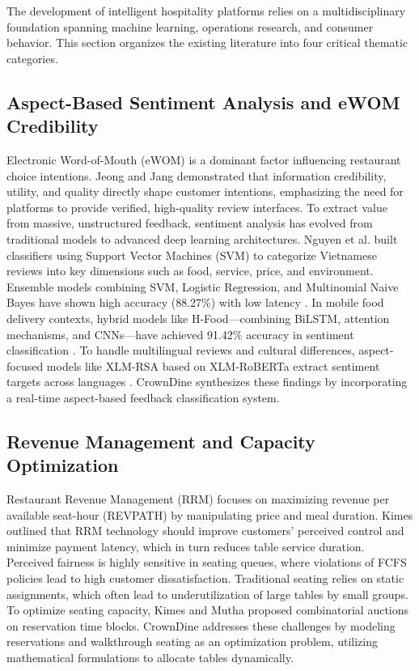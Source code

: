 \documentclass[pdflatex,sn-mathphys-num]{sn-jnl}%
\theoremstyle{thmstyleone}%
\theoremstyle{thmstyletwo}%
\theoremstyle{thmstylethree}%
\begin{document}
The development of intelligent hospitality platforms relies on a multidisciplinary foundation spanning machine learning, operations research, and consumer behavior. This section organizes the existing literature into four critical thematic categories.

\subsection{Aspect-Based Sentiment Analysis and eWOM Credibility}
Electronic Word-of-Mouth (eWOM) is a dominant factor influencing restaurant choice intentions. Jeong and Jang \cite{art6} demonstrated that information credibility, utility, and quality directly shape customer intentions, emphasizing the need for platforms to provide verified, high-quality review interfaces. To extract value from massive, unstructured feedback, sentiment analysis has evolved from traditional models to advanced deep learning architectures. Nguyen et al. \cite{art3} built classifiers using Support Vector Machines (SVM) to categorize Vietnamese reviews into key dimensions such as food, service, price, and environment. Ensemble models combining SVM, Logistic Regression, and Multinomial Naive Bayes have shown high accuracy (88.27\%) with low latency \cite{art14}. In mobile food delivery contexts, hybrid models like H-Food—combining BiLSTM, attention mechanisms, and CNNs—have achieved 91.42\% accuracy in sentiment classification \cite{art4}. To handle multilingual reviews and cultural differences, aspect-focused models like XLM-RSA based on XLM-RoBERTa extract sentiment targets across languages \cite{art12}. CrownDine synthesizes these findings by incorporating a real-time aspect-based feedback classification system.

\subsection{Revenue Management and Capacity Optimization}
Restaurant Revenue Management (RRM) focuses on maximizing revenue per available seat-hour (REVPATH) by manipulating price and meal duration. Kimes \cite{art17, art19} outlined that RRM technology should improve customers' perceived control and minimize payment latency, which in turn reduces table service duration. Perceived fairness is highly sensitive in seating queues, where violations of FCFS policies lead to high customer dissatisfaction. Traditional seating relies on static assignments, which often lead to underutilization of large tables by small groups. To optimize seating capacity, Kimes and Mutha \cite{art16} proposed combinatorial auctions on reservation time blocks. CrownDine addresses these challenges by modeling reservations and walkthrough seating as an optimization problem, utilizing mathematical formulations to allocate tables dynamically.
\end{document}
